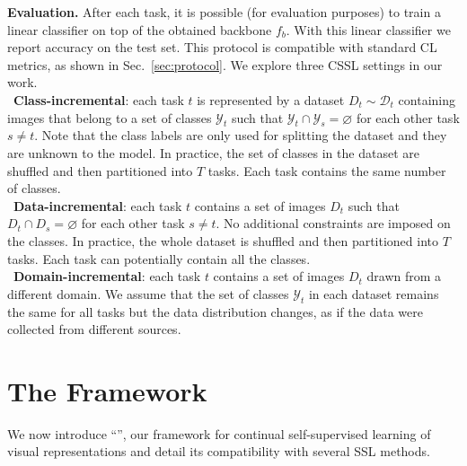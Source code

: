 \noindent\textbf{Evaluation.} After each task, it is possible (for evaluation purposes) to train a linear classifier on top of the obtained backbone $f_b$. With this linear classifier we report accuracy on the test set. This protocol is compatible with standard CL metrics, as shown in Sec.~\ref{sec:protocol}.
We explore three CSSL settings in our work.\\
\mybullet\ \textbf{Class-incremental}: each task $t$ is represented by a dataset $D_t \sim \mathcal{D}_t$ containing images that belong to a set of classes $\mathcal{Y}_t$ such that $\mathcal{Y}_t \cap \mathcal{Y}_s = \varnothing$ for each other task $s \neq t$. Note that the class labels are only used for splitting the dataset and they are unknown to the model. In practice, the set of classes in the dataset are shuffled and then partitioned into $T$ tasks. Each task contains the same number of classes.\\
\mybullet\ \textbf{Data-incremental}: each task $t$ contains a set of images $D_t$ such that $D_t \cap D_s = \varnothing$ for each other task $s \neq t$. No additional constraints are imposed on the classes. In practice, the whole dataset is shuffled and then partitioned into $T$ tasks. Each task can potentially contain all the classes. \\
\mybullet\ \textbf{Domain-incremental}: each task $t$ contains a set of images $D_t$ drawn from a different domain. We assume that the set of classes $\mathcal{Y}_t$ in each dataset remains the same for all tasks but the data distribution changes, as if the data were collected from different sources. 
\vspace{-5pt}
\section{The \name{} Framework}
\label{sec:cassowary}
\vspace{-5pt}
We now introduce ``\name{}'', our framework for 
continual self-supervised learning of visual representations and detail its compatibility with several SSL methods.
\vspace{2pt}

